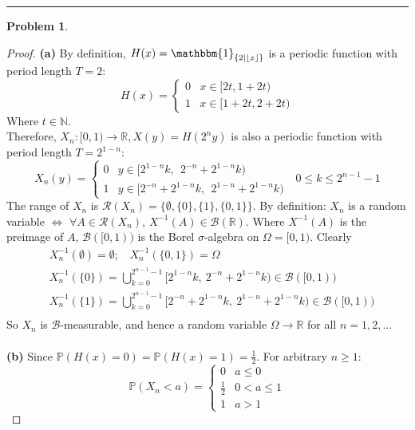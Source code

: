 \documentclass[a4paper, 10pt]{article}
\theoremstyle{definition}
\newtheorem{problem}{Problem}
\theoremstyle{hSol}
\begin{document}
\noindent\rule{16cm}{0.4pt}
\begin{problem}
\end{problem}
\begin{proof} \textbf{(a)} By definition, $H(x) = \mathbbm{1}_{\{2|\left \lfloor{x}\right \rfloor\}}$ is a periodic function with period length $T=2$:
$$
H(x) = \begin{cases}
0 & x \in [2t, 1+2t)\\
1 & x \in [1+2t, 2+2t)
\end{cases}
$$
Where $t\in \mathbb{N}$. \\
Therefore, $X_n: [0,1)\to \mathbb{R}, X(y)=H(2^ny)$ is also a periodic function with period length $T=2^{1-n}$:
$$
X_n(y) = \begin{cases}
0 & y \in [2^{1-n}k,~~2^{-n}+2^{1-n}k)\\
1 & y \in [2^{-n}+2^{1-n}k,~~2^{1-n}+2^{1-n}k)
\end{cases}~~~0\leq k\leq 2^{n-1}-1
$$
The range of $X_n$ is $\mathcal{R}(X_n) = \{\emptyset, \{0\}, \{1\},\{0,1\}\}$. By definition: $X_n$ is a random variable $\iff$ $\forall A \in \mathcal{R}(X_n)$, $X^{-1}(A) \in \mathcal{B}(\mathbb{R})$. Where $X^{-1}(A)$ is the preimage of $A$, $\mathcal{B}([0,1))$ is the Borel $\sigma$-algebra on $\Omega = [0,1)$. Clearly
\begin{equation}
	\begin{split}
		&X_n^{-1}(\emptyset) = \emptyset;~~~~X_n^{-1}(\{0,1\}) = \Omega\\
		&X_n^{-1}(\{0\}) = \bigcup_{k = 0}^{2^{n-1}-1} [2^{1-n}k,~2^{-n}+2^{1-n}k) \in \mathcal{B}([0,1))\\
		&X_n^{-1}(\{1\}) = \bigcup_{k=0}^{2^{n-1}-1} [2^{-n}+2^{1-n}k,~2^{1-n}+2^{1-n}k) \in \mathcal{B}([0,1))\\
	\end{split}
\end{equation}
So $X_n$ is $\mathcal{B}$-measurable, and hence a random variable $\Omega \to \mathbb{R}$ for all $n=1,2,..$.\\
~\\
\textbf{(b)} Since $\mathbb{P}\left(H(x)=0\right)=\mathbb{P}\left(H(x)=1\right)=\frac{1}{2}$. For arbitrary $n\geq 1$: 
\begin{equation}
	\mathbb{P}\left(X_n< a\right) = \begin{cases}
	0 & a \leq 0\\
	\frac{1}{2} & 0 < a \leq 1\\
	1 & a > 1

\end{cases}
\end{equation}
\end{proof}
\end{document}

